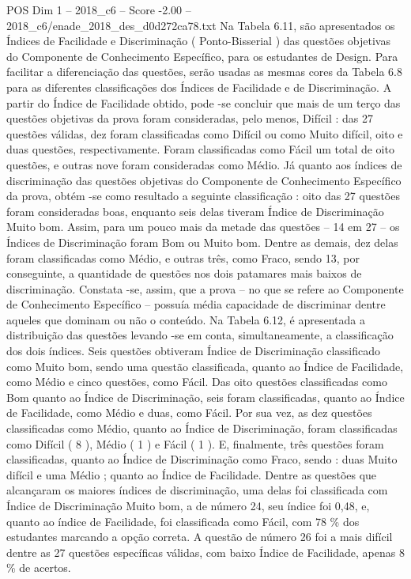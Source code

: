 \begin{textsample}{POS Dim 1 – 2018\_c6 – Score -2.00 – 2018\_c6/enade\_2018\_des\_d0d272ca78.txt}
Na Tabela 6.11, são apresentados os Índices de Facilidade e Discriminação ( Ponto-Bisserial ) das questões objetivas do Componente de Conhecimento Específico, para os estudantes de Design.
Para facilitar a diferenciação das questões, serão usadas as mesmas cores da Tabela 6.8 para as diferentes classificações dos Índices de Facilidade e de Discriminação.
A partir do Índice de Facilidade obtido, pode -se concluir que mais de um terço das questões objetivas da prova foram consideradas, pelo menos, Difícil : das 27 questões válidas, dez foram classificadas como Difícil ou como Muito difícil, oito e duas questões, respectivamente.
Foram classificadas como Fácil um total de oito questões, e outras nove foram consideradas como Médio.
Já quanto aos índices de discriminação das questões objetivas do Componente de Conhecimento Específico da prova, obtém -se como resultado a seguinte classificação : oito das 27 questões foram consideradas boas, enquanto seis delas tiveram Índice de Discriminação Muito bom.
Assim, para um pouco mais da metade das questões – 14 em 27 – os Índices de Discriminação foram Bom ou Muito bom.
Dentre as demais, dez delas foram classificadas como Médio, e outras três, como Fraco, sendo 13, por conseguinte, a quantidade de questões nos dois patamares mais baixos de discriminação.
Constata -se, assim, que a prova – no que se refere ao Componente de Conhecimento Específico – possuía média capacidade de discriminar dentre aqueles que dominam ou não o conteúdo.
Na Tabela 6.12, é apresentada a distribuição das questões levando -se em conta, simultaneamente, a classificação dos dois índices.
Seis questões obtiveram Índice de Discriminação classificado como Muito bom, sendo uma questão classificada, quanto ao Índice de Facilidade, como Médio e cinco questões, como Fácil.
Das oito questões classificadas como Bom quanto ao Índice de Discriminação, seis foram classificadas, quanto ao Índice de Facilidade, como Médio e duas, como Fácil.
Por sua vez, as dez questões classificadas como Médio, quanto ao Índice de Discriminação, foram classificadas como Difícil ( 8 ), Médio ( 1 ) e Fácil ( 1 ).
E, finalmente, três questões foram classificadas, quanto ao Índice de Discriminação como Fraco, sendo : duas Muito difícil e uma Médio ; quanto ao Índice de Facilidade.
Dentre as questões que alcançaram os maiores índices de discriminação, uma delas foi classificada com Índice de Discriminação Muito bom, a de número 24, seu índice foi 0,48, e, quanto ao índice de Facilidade, foi classificada como Fácil, com 78 \% dos estudantes marcando a opção correta.
A questão de número 26 foi a mais difícil dentre as 27 questões específicas válidas, com baixo Índice de Facilidade, apenas 8 \% de acertos.

\end{textsample}
